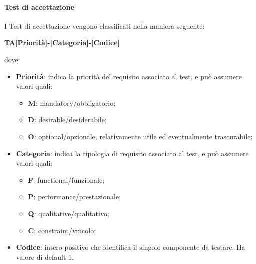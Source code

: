 		\paragraph{Test di accettazione}
		I Test di accettazione vengono classificati nella maniera seguente:
		\begin{center}
			\textbf{TA[Priorità]-[Categoria]-[Codice]}
		\end{center}		 
		dove:\\
		\begin{itemize}
			\item \textbf{Priorità}: indica la priorità del requisito associato al test, e può assumere valori quali:
			\begin{itemize}
				\item \textbf{M}: mandatory/obbligatorio;
				\item \textbf{D}: desirable/desiderabile;
				\item \textbf{O}: optional/opzionale, relativamente utile ed eventualmente trascurabile;
			\end{itemize}
			\item \textbf{Categoria}: indica la tipologia di requisito associato al test, e può assumere valori quali:
			\begin{itemize}
				\item \textbf{F}: functional/funzionale;
				\item \textbf{P}: performance/prestazionale;
				\item \textbf{Q}: qualitative/qualitativo;
				\item \textbf{C}: constraint/vincolo;
			\end{itemize}
			\item \textbf{Codice}: intero positivo che identifica il singolo componente da testare. Ha valore di default 1.
		\end{itemize}